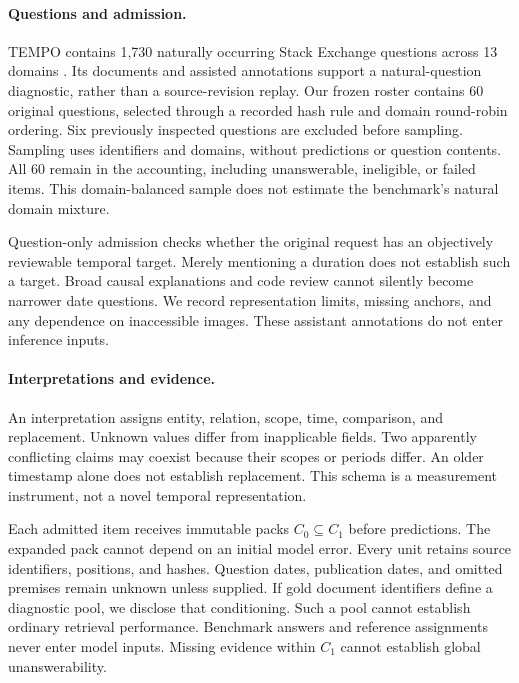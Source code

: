 \documentclass[11pt]{article}
\begin{document}
\paragraph{Questions and admission.}
TEMPO contains 1,730 naturally occurring Stack Exchange questions across 13 domains \citep{abdallah2026tempo}.
Its documents and assisted annotations support a natural-question diagnostic, rather than a source-revision replay.
Our frozen roster contains 60 original questions, selected through a recorded hash rule and domain round-robin ordering.
Six previously inspected questions are excluded before sampling.
Sampling uses identifiers and domains, without predictions or question contents.
All 60 remain in the accounting, including unanswerable, ineligible, or failed items.
This domain-balanced sample does not estimate the benchmark's natural domain mixture.

Question-only admission checks whether the original request has an objectively reviewable temporal target.
Merely mentioning a duration does not establish such a target.
Broad causal explanations and code review cannot silently become narrower date questions.
We record representation limits, missing anchors, and any dependence on inaccessible images.
These assistant annotations do not enter inference inputs.

\paragraph{Interpretations and evidence.}
An interpretation assigns entity, relation, scope, time, comparison, and replacement.
Unknown values differ from inapplicable fields.
Two apparently conflicting claims may coexist because their scopes or periods differ.
An older timestamp alone does not establish replacement.
This schema is a measurement instrument, not a novel temporal representation.

Each admitted item receives immutable packs $C_0\subseteq C_1$ before predictions.
The expanded pack cannot depend on an initial model error.
Every unit retains source identifiers, positions, and hashes.
Question dates, publication dates, and omitted premises remain unknown unless supplied.
If gold document identifiers define a diagnostic pool, we disclose that conditioning.
Such a pool cannot establish ordinary retrieval performance.
Benchmark answers and reference assignments never enter model inputs.
Missing evidence within $C_1$ cannot establish global unanswerability.
\end{document}

